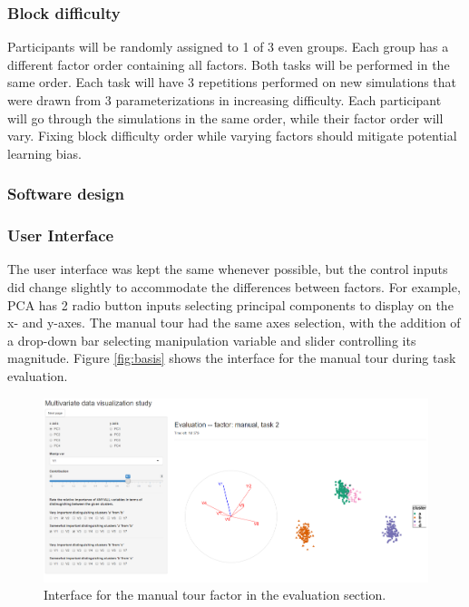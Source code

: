 \documentclass[
  11,
]{article}
\begin{document}
\hypertarget{sec:blocks}{%
\subsubsection{Block difficulty}\label{sec:blocks}}

Participants will be randomly assigned to 1 of 3 even groups. Each group has a different factor order containing all factors. Both tasks will be performed in the same order. Each task will have 3 repetitions performed on new simulations that were drawn from 3 parameterizations in increasing difficulty. Each participant will go through the simulations in the same order, while their factor order will vary. Fixing block difficulty order while varying factors should mitigate potential learning bias.

\hypertarget{software-design}{%
\subsubsection{Software design}\label{software-design}}

\hypertarget{user-interface}{%
\subsubsection{User Interface}\label{user-interface}}

The user interface was kept the same whenever possible, but the control inputs did change slightly to accommodate the differences between factors. For example, PCA has 2 radio button inputs selecting principal components to display on the x- and y-axes. The manual tour had the same axes selection, with the addition of a drop-down bar selecting manipulation variable and slider controlling its magnitude. Figure \ref{fig:basis} shows the interface for the manual tour during task evaluation.

\begin{figure}[h]

{\centering \includegraphics[width=0.8\linewidth,]{./figures/appManualFactor} 

}

\caption{Interface for the manual tour factor in the evaluation section.}\label{fig:appManualFactpr}
\end{figure}
\end{document}
